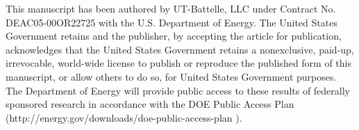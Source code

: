 \documentclass[conference]{IEEEtran}
\begin{document}
This manuscript has been authored by UT-Battelle, LLC under Contract No.
DEAC05-00OR22725 with the U.S. Department of Energy. The United States
Government retains and the publisher, by accepting the article for
publication, acknowledges that the United States Government retains a
nonexclusive, paid-up, irrevocable, world-wide license to publish or
reproduce the published form of this manuscript, or allow others to do
so, for United States Government purposes. The Department of Energy will
provide public access to these results of federally sponsored research
in accordance with the DOE Public Access Plan
(http://energy.gov/downloads/doe-public-access-plan ).













\end{document}
